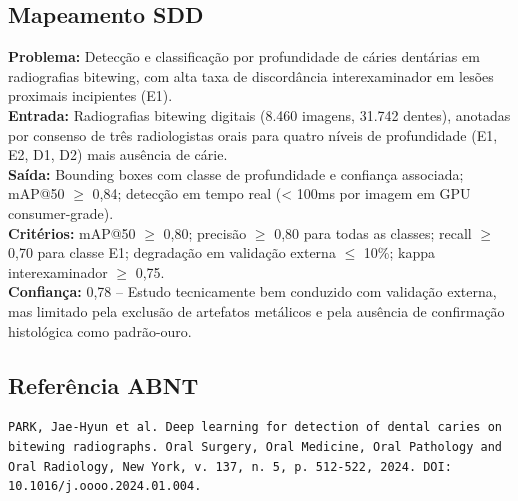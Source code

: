 \subsection{Mapeamento SDD}
\textbf{Problema:} Detecção e classificação por profundidade de cáries
dentárias em radiografias bitewing, com alta taxa de discordância
interexaminador em lesões proximais incipientes (E1). \\
\textbf{Entrada:} Radiografias bitewing digitais (8.460 imagens, 31.742
dentes), anotadas por consenso de três radiologistas orais para quatro
níveis de profundidade (E1, E2, D1, D2) mais ausência de cárie. \\
\textbf{Saída:} Bounding boxes com classe de profundidade e confiança
associada; mAP@50 $\geq$ 0,84; detecção em tempo real (< 100ms por
imagem em GPU consumer-grade). \\
\textbf{Critérios:} mAP@50 $\geq$ 0,80; precisão $\geq$ 0,80 para todas
as classes; recall $\geq$ 0,70 para classe E1; degradação em validação
externa $\leq$ 10\%; kappa interexaminador $\geq$ 0,75. \\
\textbf{Confiança:} 0,78 -- Estudo tecnicamente bem conduzido com
validação externa, mas limitado pela exclusão de artefatos metálicos e
pela ausência de confirmação histológica como padrão-ouro.

\subsection{Referência ABNT}
\begin{verbatim}
PARK, Jae-Hyun et al. Deep learning for detection of dental caries on
bitewing radiographs. Oral Surgery, Oral Medicine, Oral Pathology and
Oral Radiology, New York, v. 137, n. 5, p. 512-522, 2024. DOI:
10.1016/j.oooo.2024.01.004.
\end{verbatim}
\endinput
